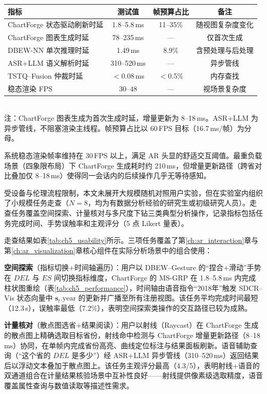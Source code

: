 \begin{center}
  \small
  \setlength{\tabcolsep}{10pt}
  \begin{tabular}{lccc}
  \hline
  指标 & 测试值 & 帧预算占比 & 备注 \\
  \hline
  ChartForge 状态驱动刷新时延 & 1.8--5.8\,ms & 11--35\% & 随视图复杂度变化 \\
  ChartForge 图表生成时延 & 78--235\,ms & — & 仅首次生成 \\
  DBEW-NN 单次推理时延 & 1.49\,ms & 8.9\% & 含预处理与后处理 \\
  ASR+LLM 语义解析时延 & 310--520\,ms & — & 异步管线 \\
  TSTQ--Fusion 仲裁时延 & $<$0.08\,ms & $<$0.5\% & 内存查找 \\
  稳态渲染 FPS & 30--48 & — & 视场景复杂度 \\
  \hline
  \end{tabular}
  \\[4pt]
  {\footnotesize 注：ChartForge 图表生成为首次生成时延，增量更新为 8--18\,ms。ASR+LLM 为异步管线，不阻塞渲染主线程。帧预算占比以 60\,FPS 目标（16.7\,ms/帧）为分母。}
\end{center}

系统稳态渲染帧率维持在 30\,FPS 以上，满足 AR 头显的舒适交互阈值。最重负载场景（四象限布局）下 ChartForge 生成耗时约 210\,ms，但增量更新路径（跨省对比叠加仅 8--18\,ms）使得同一会话内的后续操作几乎无等待感知。

受设备与伦理流程限制，本文未展开大规模随机对照用户实验，但在实验室内组织了小规模任务走查（$N=8$，均为有数据分析经验的研究生或初级研究人员）。走查任务覆盖空间探索、计量核对与多尺度下钻三类典型分析操作，记录指标包括任务完成时间、手势误触率和主观评分（5 点 Likert 量表）。

走查结果如表\ref{tab:ch5_usability}所示。三项任务覆盖了第\ref{ch:ar_interaction}章与第\ref{ch:ar_visualization}章核心组件在实际分析场景中的组合使用：

\textbf{空间探索}（指标切换+时间轴遍历）：用户以 DBEW--Gesture 的``捏合+滑动''手势在 $DEL$ 与 $ES$ 间切换指标维度，ChartForge 的 MS-GRP 在 1.8--5.8\,ms 内完成柱状图重绘（表\ref{tab:ch5_performance}），时间轴由语音指令``2018年''触发 SDCR--Vis 状态向量中 $\mathbf{s}_t.\mathrm{year}$ 的更新并广播至所有注册视图。该任务平均完成时间最短（12.3\,s），误触率最低（7.2\%），表明空间探索类操作的交互路径已较为成熟。

\textbf{计量核对}（散点图选省+结果阅读）：用户以射线（Raycast）在 ChartForge 生成的散点图上精确选取目标省份，射线命中检测与 ChartForge 增量更新路径（8--18\,ms）协同，在单帧内完成省份高亮、曲线定位标注与结果面板刷新。语音辅助查询（``这个省的 $DEL$ 是多少''）经 ASR+LLM 异步管线（310--520\,ms）返回结果后以浮动文本叠加于散点图上。该任务主观评分最高（4.3/5），表明射线+语音的双通道组合在计量结果核验场景中互补性良好——射线提供像素级选取精度，语音覆盖属性查询与数值读取等描述性需求。

